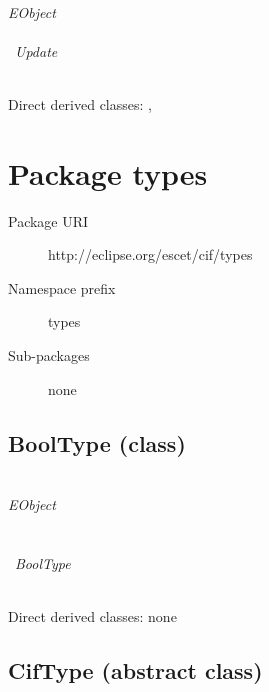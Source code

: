 ~\\ \noindent \emph{EObject} \\
\hook~ \\
\hookindent\hook~\emph{Update}

~\\ \noindent Direct derived classes:
, 

\begin{description}
{\featdocuPositionObjectposition}
\end{description}



\section{Package types}\label{cifpkg:types}
\pkgdocutypes

\begin{description}
\item[Package URI] http://eclipse.org/escet/cif/types
\item[Namespace prefix] types
\item[Sub-packages] none
\end{description}

\subsection{BoolType (class)}\label{cifclass:BoolType}
\clsdocuBoolType

~\\ \noindent \emph{EObject} \\
\hook~ \\
\hookindent\hook~ \\
\hookindent\hookindent\hook~\emph{BoolType}

~\\ \noindent Direct derived classes:
none

\begin{description}
{\featdocuPositionObjectposition}
\end{description}


\subsection{CifType (abstract class)}\label{cifclass:CifType}
\clsdocuCifType

